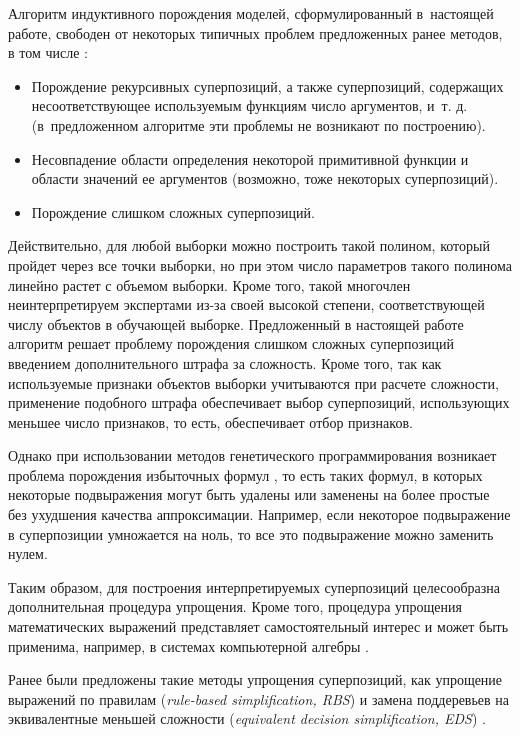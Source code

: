 \documentclass[12pt,a4paper]{article}
\begin{document}
Алгоритм индуктивного порождения моделей, сформулированный в~настоящей работе,
свободен от некоторых типичных проблем предложенных ранее методов, в том числе
\cite{Zelinka2008}:
\begin{itemize}
  \item Порождение рекурсивных суперпозиций, а также суперпозиций, содержащих
	несоответствующее используемым функциям число аргументов, и~т. д.
	(в~предложенном алгоритме эти проблемы не возникают по построению).
  \item Несовпадение области определения некоторой примитивной функции и области
	значений ее аргументов (возможно, тоже некоторых суперпозиций).
  \item Порождение слишком сложных суперпозиций.
\end{itemize}

Действительно, для любой выборки можно построить такой полином, который пройдет через
все точки выборки, но при этом число параметров такого полинома линейно
растет с объемом выборки. Кроме того, такой многочлен неинтерпретируем
экспертами из-за своей высокой степени, соответствующей числу объектов в обучающей
выборке. Предложенный в настоящей работе алгоритм решает проблему
порождения слишком сложных суперпозиций введением дополнительного штрафа
за сложность. Кроме того, так как используемые признаки объектов выборки
учитываются при расчете сложности, применение подобного штрафа обеспечивает
выбор суперпозиций, использующих меньшее число признаков, то есть, обеспечивает
отбор признаков.

Однако при использовании методов генетического программирования возникает
проблема порождения избыточных формул \cite{Soule97,Soule98,Streeter03}, то
есть таких формул, в которых некоторые подвыражения могут быть удалены или
заменены на более простые без ухудшения качества аппроксимации. Например,
если некоторое подвыражение в суперпозиции умножается на ноль, то все это
подвыражение можно заменить нулем.

Таким образом, для построения интерпретируемых суперпозиций целесообразна
дополнительная процедура упрощения.
Кроме того, процедура упрощения математических выражений представляет
самостоятельный интерес и может быть применима, например, в системах компьютерной
алгебры \cite{Carette04}.

Ранее были предложены такие методы упрощения суперпозиций, как упрощение
выражений по правилам (\emph{rule-based simplification, RBS}) \cite{Ehrig2006,EhrigHandbook}
и замена поддеревьев на эквивалентные меньшей сложности (\emph{equivalent
decision simplification, EDS}) \cite{MoriSimpl}.
\end{document}
